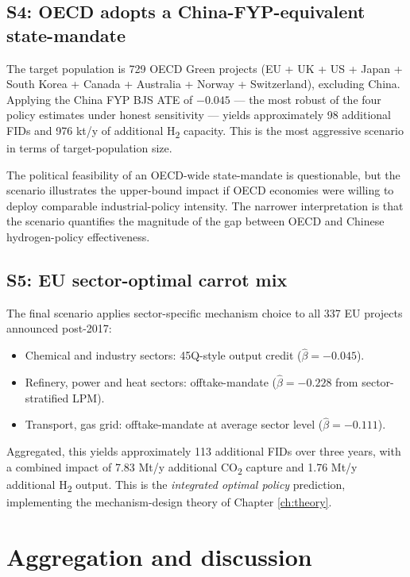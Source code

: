 \subsection{S4: OECD adopts a China-FYP-equivalent state-mandate}

The target population is 729 OECD Green projects (EU + UK + US + Japan + South Korea + Canada + Australia + Norway + Switzerland), excluding China. Applying the China FYP BJS ATE of $-0.045$ --- the most robust of the four policy estimates under honest sensitivity --- yields approximately 98 additional FIDs and 976 kt/y of additional H\textsubscript{2} capacity. This is the most aggressive scenario in terms of target-population size.

The political feasibility of an OECD-wide state-mandate is questionable, but the scenario illustrates the upper-bound impact if OECD economies were willing to deploy comparable industrial-policy intensity. The narrower interpretation is that the scenario quantifies the magnitude of the gap between OECD and Chinese hydrogen-policy effectiveness.

\subsection{S5: EU sector-optimal carrot mix}

The final scenario applies sector-specific mechanism choice to all 337 EU projects announced post-2017:
\begin{itemize}[leftmargin=2em]
\item Chemical and industry sectors: 45Q-style output credit ($\hat{\beta} = -0.045$).
\item Refinery, power and heat sectors: offtake-mandate ($\hat{\beta} = -0.228$ from sector-stratified LPM).
\item Transport, gas grid: offtake-mandate at average sector level ($\hat{\beta} = -0.111$).
\end{itemize}

Aggregated, this yields approximately 113 additional FIDs over three years, with a combined impact of 7.83 Mt/y additional CO\textsubscript{2} capture and 1.76 Mt/y additional H\textsubscript{2} output. This is the \emph{integrated optimal policy} prediction, implementing the mechanism-design theory of Chapter \ref{ch:theory}.

\section{Aggregation and discussion}
\label{sec:counterfactual_aggregation}

